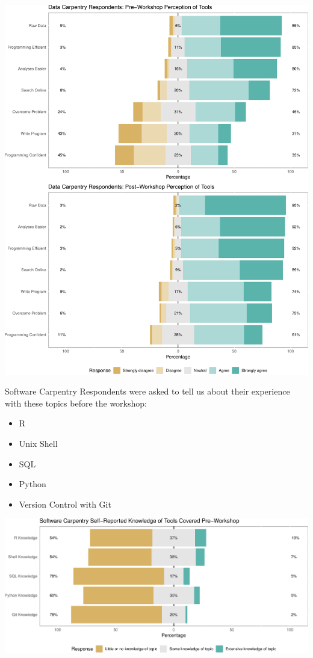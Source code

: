 \documentclass[]{article}
\providecommand{\tightlist}{%
  \setlength{\itemsep}{0pt}\setlength{\parskip}{0pt}}
\begin{document}
\includegraphics[width=720]{figures/dc-tools-perception-1}

Software Carpentry Respondents were asked to tell us about their
experience with these topics before the workshop:

\begin{itemize}
\tightlist
\item
  R
\item
  Unix Shell
\item
  SQL
\item
  Python
\item
  Version Control with Git
\end{itemize}

\includegraphics[width=720]{figures/swc-pre-tools-1}
\end{document}
